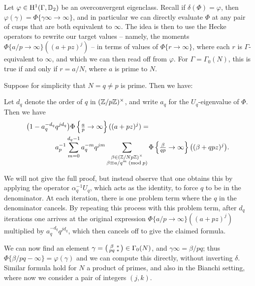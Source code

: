 \documentclass[a4paper,11pt]{article}
\numberwithin{equation}{section}
\begin{document}
Let $\varphi \in \mathrm{H}^1(\Gamma,\mathbb{D}_2)$ be an overconvergent eigenclass. Recall if $\delta(\Phi) = \varphi$, then $\varphi(\gamma) = \Phi\{\gamma\infty \to \infty\}$, and in particular we can directly evaluate $\Phi$ at any pair of cusps that are both equivalent to $\infty$. The idea is then to use the Hecke operators to rewrite our target values -- namely, the moments $\Phi\{a/p \to \infty\}((a+pz)^j)$ -- in terms of values of $\Phi\{r\to \infty\}$, where each $r$ is $\Gamma$-equivalent to $\infty$, and which we can then read off from $\varphi$. For $\Gamma = \Gamma_0(N)$, this is true if and only if $r = a/N$, where $a$ is prime to $N$. 

Suppose for simplicity that $N = q \neq p$ is prime. Then we have:
\begin{proposition}
Let $d_q$ denote the order of $q$ in $(\mathbb{Z}/p\mathbb{Z})^\times$, and write $a_q$ for the $U_q$-eigenvalue of $\Phi$. Then we have
\begin{align*}
\big(1 -a_q^{-d_q}&q^{jd_q}\big)\Phi\left\{\tfrac{a}{p}\rightarrow\infty\right\}((a+pz)^j) =
\\
& a_p^{-1} \sum_{m = 0}^{d_q-1} a_q^{-m}q^{jm}%
\sum_{\substack{\beta \in (\Z/Np\Z)^\times\\ \beta \equiv a/q^m\newmod{p}}} \Phi\left\{\tfrac{\beta}{qp}\rightarrow \infty\right\}\big((\beta + qpz)^j\big).
\end{align*}
\end{proposition}
We will not give the full proof, but instead observe that one obtains this by applying the operator $\alpha_q^{-1}U_q$, which acts as the identity, to force $q$ to be in the denominator. At each iteration, there is one problem term where the $q$ in the denominator cancels. By repeating this process with this problem term, after $d_q$ iterations one arrives at the original expression $\Phi\{a/p \to \infty\}((a+pz)^j)$ multiplied by $a_q^{-d_q}q^{jd_q}$, which then cancels off to give the claimed formula.

We can now find an element $\gamma = \left(\begin{smallmatrix}\beta & *\\pq & *\end{smallmatrix}\right) \in \Gamma_0(N)$, and $\gamma\infty = \beta/pq$; thus $\Phi\{\beta/pq - \infty\} = \varphi(\gamma)$ and we can compute this directly, without inverting $\delta$. Similar formula hold for $N$ a product of primes, and also in the Bianchi setting, where now we consider a pair of integers $(j,k)$.
\end{document}
